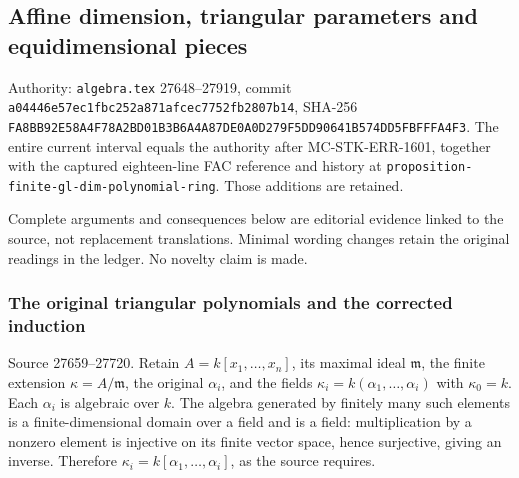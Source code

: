 \subsection{Affine dimension, triangular parameters and equidimensional pieces}\label{algebra-proof-025-affine-dimension-triangular-parameters-and-equidimensional-pieces}

Authority: \texttt{algebra.tex} 27648--27919, commit \texttt{a044\allowbreak{}46e5\allowbreak{}7ec1\allowbreak{}fbc2\allowbreak{}52a8\allowbreak{}71af\allowbreak{}cec7\allowbreak{}752f\allowbreak{}b280\allowbreak{}7b14}, SHA-256 \texttt{FA8B\allowbreak{}B92E\allowbreak{}58A4\allowbreak{}F78A\allowbreak{}2BD0\allowbreak{}1B3B\allowbreak{}6A4A\allowbreak{}87DE\allowbreak{}0A0D\allowbreak{}279F\allowbreak{}5DD9\allowbreak{}0641\allowbreak{}B574\allowbreak{}DD5F\allowbreak{}BFFF\allowbreak{}A4F3}. The entire current interval equals the authority after MC-STK-ERR-1601, together with the captured eighteen-line FAC reference and history at \texttt{proposition-finite-gl-dim-polynomial-ring}. Those additions are retained.

Complete arguments and consequences below are editorial evidence linked to the source, not replacement translations. Minimal wording changes retain the original readings in the ledger. No novelty claim is made.

\subsubsection{The original triangular polynomials and the corrected induction}\label{algebra-proof-025-the-original-triangular-polynomials-and-the-corrected-induction}

Source 27659--27720. Retain \(A=k[x_1,\ldots,x_n]\), its maximal ideal \(\mathfrak m\), the finite extension \(\kappa=A/\mathfrak m\), the original \(\alpha_i\), and the fields \(\kappa_i=k(\alpha_1,\ldots,\alpha_i)\) with \(\kappa_0=k\). Each \(\alpha_i\) is algebraic over \(k\). The algebra generated by finitely many such elements is a finite-dimensional domain over a field and is a field: multiplication by a nonzero element is injective on its finite vector space, hence surjective, giving an inverse. Therefore \(\kappa_i=k[\alpha_1,\ldots,\alpha_i]\), as the source requires.

